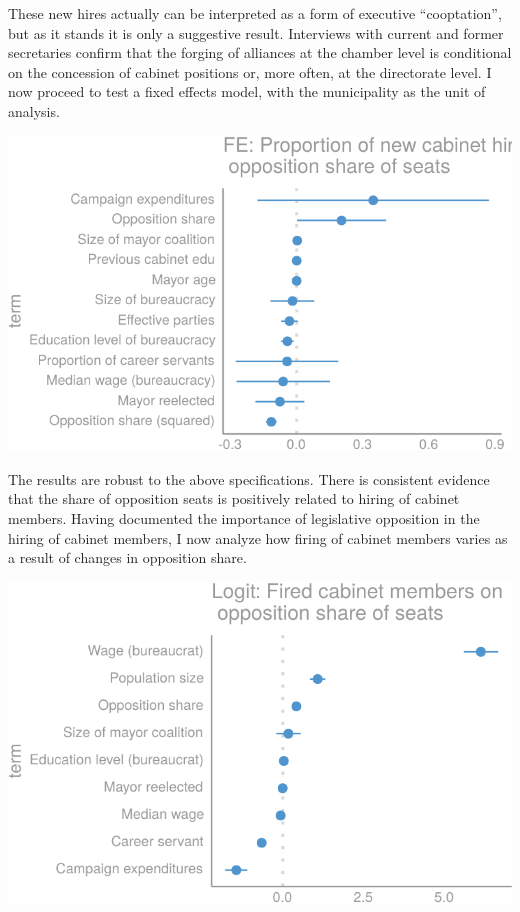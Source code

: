 \documentclass[12pt,]{article}
\begin{document}
These new hires actually can be interpreted as a form of executive
``cooptation'', but as it stands it is only a suggestive result.
Interviews with current and former secretaries confirm that the forging
of alliances at the chamber level is conditional on the concession of
cabinet positions or, more often, at the directorate level. I now
proceed to test a fixed effects model, with the municipality as the unit
of analysis.

\begin{center}\includegraphics{dissertation_files/figure-latex/hiring municipal-1} \end{center}

The results are robust to the above specifications. There is consistent
evidence that the share of opposition seats is positively related to
hiring of cabinet members. Having documented the importance of
legislative opposition in the hiring of cabinet members, I now analyze
how firing of cabinet members varies as a result of changes in
opposition share.

\begin{center}\includegraphics{dissertation_files/figure-latex/firing-1} \end{center}
\end{document}
